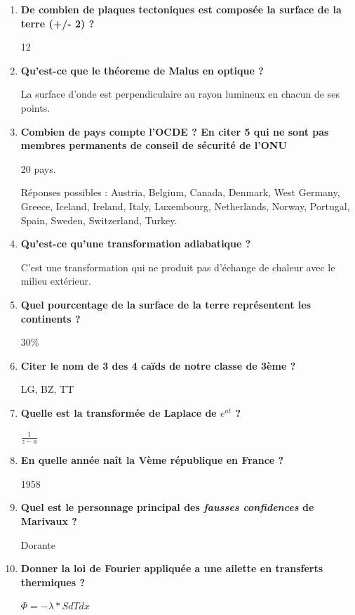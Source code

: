 \documentclass[12pt]{article}
\begin{document}
\begin{enumerate}
  \item \textbf{De combien de plaques tectoniques est composée la surface de la terre (+/- 2) ?}
  
  12
  
  \item \textbf{Qu'est-ce que le théoreme de Malus en optique ?}
  
  La surface d'onde est perpendiculaire au rayon lumineux en chacun de ses points.
  
  \item \textbf{Combien de pays compte l'OCDE ? En citer 5 qui ne sont pas membres permanents de conseil de sécurité de l'ONU }
  
  20 pays.
  
  Réponses possibles : Austria, Belgium, Canada, Denmark, West Germany, Greece, Iceland, Ireland, Italy, Luxembourg, Netherlands, Norway, Portugal, Spain, Sweden, Switzerland, Turkey.
  
  \item \textbf{Qu'est-ce qu'une transformation adiabatique ?}
  
  C'est une transformation qui ne produit pas d'échange de chaleur avec le milieu extérieur.
  
  \item \textbf{Quel pourcentage de la surface de la terre représentent les continents ?}
  
  30\%

  \item \textbf{Citer le nom de 3 des 4 caïds de notre classe de 3ème ?}
  
  LG, BZ, TT
  
  \item \textbf{Quelle est la transformée de Laplace de $e^{at}$ ?}
  
  $\frac{1}{z-a}$
  
  \item \textbf{En quelle année naît la Vème république en France ?}
  
  1958
  
  \item \textbf{Quel est le personnage principal des \textit{fausses confidences} de Marivaux ?}
  
  Dorante
  
  \item \textbf{Donner la loi de Fourier appliquée a une ailette en transferts thermiques ?}
  
  $\Phi = -\lambda * S dT dx$
  

\end{enumerate}
\end{document}
